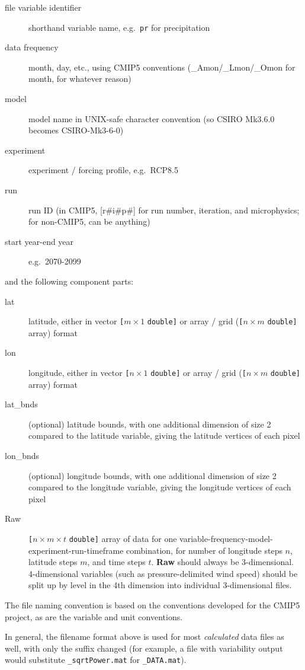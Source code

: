 \documentclass{article}
\begin{document}
\begin{description}
\item [file variable identifier] shorthand variable name, e.g.\ \texttt{pr} for precipitation
\item [data frequency] month, day, etc., using CMIP5 conventions (\_Amon/\_Lmon/\_Omon for month, for whatever reason)
\item [model] model name in UNIX-safe character convention (so CSIRO Mk3.6.0 becomes CSIRO-Mk3-6-0)
\item [experiment] experiment / forcing profile, e.g.\ RCP8.5
\item [run] run ID (in CMIP5, [r\#i\#p\#] for run number, iteration, and microphysics; for non-CMIP5, can be anything)
\item [start year-end year] e.g.\ 2070-2099
\end{description}
and the following component parts: 
\begin{description}
\item [lat] latitude, either in vector \texttt{[}$m\times 1$ \texttt{double]} or array / grid (\texttt{[}$n\times m$ \texttt{double]} array) format
\item [lon] longitude, either in vector \texttt{[}$n\times 1$ \texttt{double]} or array / grid (\texttt{[}$n\times m$ \texttt{double]} array) format
\item [lat\_bnds] (optional) latitude bounds, with one additional dimension of size 2 compared to the latitude variable, giving the latitude vertices of each pixel
\item [lon\_bnds] (optional) longitude bounds, with one additional dimension of size 2 compared to the longitude variable, giving the longitude vertices of each pixel
\item [Raw] \texttt{[}$n\times m\times t$ \texttt{double]} array of data for one variable-frequency-model-experiment-run-timeframe combination, for number of longitude steps $n$, latitude steps $m$, and time steps $t$. \textbf{Raw} should always be 3-dimensional. 4-dimensional variables (such as pressure-delimited wind speed) should be split up by level in the 4th dimension into individual 3-dimensional files. 
\end{description}

The file naming convention is based on the conventions developed for the CMIP5 project, as are the variable and unit conventions. 

In general, the filename format above is used for most \textit{calculated} data files as well, with only the suffix changed (for example, a file with variability output would substitute \texttt{\_sqrtPower.mat} for \texttt{\_DATA.mat}).
\end{document}
